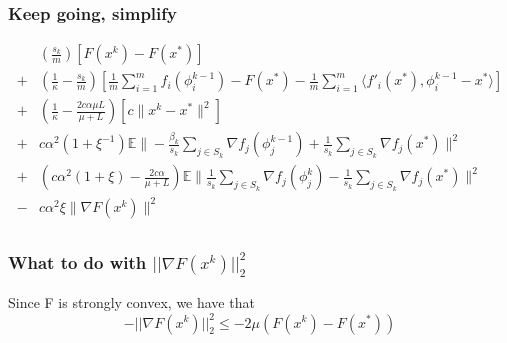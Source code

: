\documentclass[11pt]{article}
\begin{document}
\subsubsection{Keep going, simplify}
\begin{align*}
	& \left( \frac{s_k}{m}  \right) \left[   F(x^k) - F(x^*) \right] \\
	+& \left( \frac{1}{\kappa} - \frac{s_k}{m}\right) \left[ \frac{1}{m}\sum_{i =1}^{m}  f_i(\phi_i^{k-1})   - F(x^*)  -\frac{1}{m}\sum_{i =1}^{m}   \langle f'_i(x^*), \phi_i^{k-1} - x^*\rangle \right] \\
	+& \left( \frac{1}{\kappa} -\frac{ 2c \alpha \mu L}{\mu+L}\right) \left[ c \|x^k - x^* \|^2 \right] \\
	+&c \alpha^2 (1+\xi^{-1})\mathbb{E}   \|  - \frac{ \beta_k }{s_k} \sum_{j \in S_k}  \nabla f_j(\phi^{k-1}_j) + \frac{1 }{s_k} \sum_{j \in S_k}  \nabla f_j(x^*)\|^2 \\
	+&(c \alpha^2 (1+\xi)-\frac{ 2c \alpha }{\mu+L}) \mathbb{E} \| \frac{1}{s_k} \sum_{j \in S_k}  \nabla f_j(\phi_j^{k}) - \frac{ 1}{s_k} \sum_{j \in S_k}  \nabla f_j(x^*)\|^2    \\
	-&c \alpha^2 \xi \|\nabla F (x^k) \|^2 \\
\end{align*}

\subsubsection{What to do with $||\nabla F(x^k)||_2^2$}

Since F is strongly convex, we have that 
\begin{equation}
	 - ||\nabla F(x^k)||_2^2  \leq -2\mu (F(x^k) - F(x^*))
\end{equation}
\end{document}
